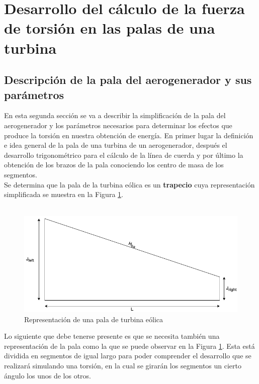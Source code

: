\section{ Desarrollo del cálculo de la fuerza de torsión en las palas de una turbina}
\label{section:2_desarollo_cálculo}
\subsection{Descripción de la pala del aerogenerador y sus parámetros}

En esta segunda sección se va a describir la simplificación de la pala del aerogenerador y los parámetros necesarios para determinar los efectos que produce la torsión en nuestra obtención de energía. En primer lugar la definición e idea general de la pala de una turbina de un aerogenerador, después el desarrollo trigonométrico para el cálculo de la línea de cuerda y por último la obtención de los brazos de la pala conociendo los centro de masa de los segmentos.\\


Se determina que la pala de la turbina eólica es un \textbf{trapecio} cuya representación simplificada se muestra en la Figura \ref{fig:pala_simp}. \\\\

\begin{figure}[H]
    \centering
    \includegraphics[width=1\textwidth]{images/pala simple.drawio.png}
    \caption{Representación de una pala de turbina eólica}
    \label{fig:pala_simp}
\end{figure}


Lo siguiente que debe tenerse presente es que se necesita también una representación de la pala como la que se puede observar en la Figura \ref{fig:pala_simp}. Esta está dividida en segmentos de igual largo para poder comprender el desarrollo que se realizará simulando una torsión, en la cual se girarán los segmentos un cierto ángulo los unos de los otros.


